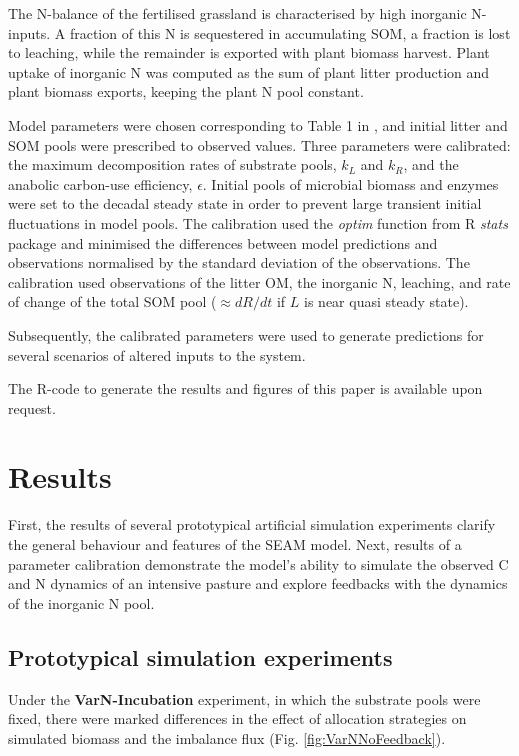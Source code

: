 The N-balance of the fertilised grassland is characterised by high inorganic
N-inputs. A fraction of this N is sequestered in accumulating SOM, a fraction is
lost to leaching, while the remainder is exported with plant biomass harvest.
Plant uptake of inorganic N was computed as the sum of plant litter production
and plant biomass exports, keeping the plant N pool constant.
 
Model parameters were chosen corresponding to Table 1 in \citet{Perveen14}, and
initial litter and SOM pools were prescribed to observed values.
Three parameters were calibrated: the maximum decomposition rates
of substrate pools, $k_L$ and $k_R$, and the anabolic carbon-use efficiency,
$\epsilon$. Initial pools of microbial biomass and enzymes were set to the
decadal steady state in order to prevent large transient initial
fluctuations in model pools. The calibration used the \textit{optim} function
from R \textit{stats} package \citep{R07} and minimised the differences between model
predictions and observations normalised by the standard deviation of the
observations. The calibration used observations of the litter OM, the inorganic
N, leaching, and rate of change of the total SOM pool ($\approx dR/dt$ if $L$ is
near quasi steady state). 

Subsequently, the calibrated parameters were used to generate
predictions for several scenarios of altered inputs to the system.

The R-code to generate the results and figures of this paper is available upon
request. 
 
\section{Results}

First, the results of several prototypical artificial simulation experiments
clarify the general behaviour and features of the SEAM model. Next, results of a
parameter calibration demonstrate the model's ability to
simulate the observed C and N dynamics of an intensive pasture and explore
feedbacks with the dynamics of the inorganic N pool.

\subsection{Prototypical simulation experiments}
\label{sec:ResultsProto}

Under the \textbf{VarN-Incubation} experiment, in which the substrate pools were fixed,
there were marked differences in the effect of allocation strategies on simulated biomass and the imbalance flux (Fig.
\ref{fig:VarNNoFeedback}).
 
